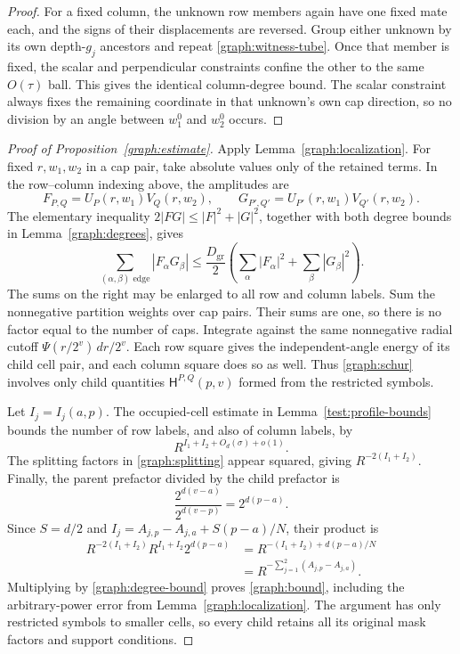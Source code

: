 \begin{proof}
For a fixed column, the unknown row members again have one fixed mate
each, and the signs of their displacements are reversed.  Group either
unknown by its own depth-$g_j$ ancestors and repeat
\eqref{graph:witness-tube}.  Once that member is fixed, the scalar and
perpendicular constraints confine the other to the same $O(\tau)$ ball.
This gives the identical column-degree bound.  The scalar constraint
always fixes the remaining coordinate in that unknown's own cap
direction, so no division by an angle between $w_1^0$ and $w_2^0$
occurs.
\end{proof}

\begin{proof}[Proof of Proposition~\ref{graph:estimate}]
Apply Lemma~\ref{graph:localization}.  For fixed $r,w_1,w_2$ in a cap
pair, take absolute values only of the retained terms.  In the
row--column indexing above, the amplitudes are
\[
 F_{P,Q}=U_P(r,w_1)V_Q(r,w_2),\qquad
 G_{P',Q'}=U_{P'}(r,w_1)V_{Q'}(r,w_2).
\]
The elementary inequality $2|FG|\le|F|^2+|G|^2$, together with both
degree bounds in Lemma~\ref{graph:degrees}, gives
\begin{equation}\label{graph:schur}
 \sum_{(\alpha,\beta)\text{ edge}}|F_\alpha G_\beta|
 \le\frac{D_{\mathrm{gr}}}{2}
       \left(\sum_\alpha|F_\alpha|^2+
             \sum_\beta|G_\beta|^2\right).
\end{equation}
The sums on the right may be enlarged to all row and column labels.
Sum the nonnegative partition weights over cap pairs.  Their sums
are one, so there is no factor equal to the number of caps.  Integrate
against the same nonnegative radial cutoff $\Psi(r/2^v)\,dr/2^v$.
Each row square gives the independent-angle energy of its child cell
pair, and each column square does so as well.  Thus
\eqref{graph:schur} involves only child quantities
$\mathsf H^{P,Q}(p,v)$ formed from the restricted symbols.

Let $I_j=I_j(a,p)$.  The occupied-cell estimate in
Lemma~\ref{test:profile-bounds} bounds the number of row labels, and
also of column labels, by
\[
 R^{I_1+I_2+O_d(\sigma)+o(1)}.
\]
The splitting factors in \eqref{graph:splitting} appear squared,
giving $R^{-2(I_1+I_2)}$.  Finally, the parent prefactor divided by
the child prefactor is
\[
 \frac{2^{d(v-a)}}{2^{d(v-p)}}=2^{d(p-a)}.
\]
Since $S=d/2$ and
$I_j=A_{j,p}-A_{j,a}+S(p-a)/N$, their product is
\begin{align*}
 R^{-2(I_1+I_2)}R^{I_1+I_2}2^{d(p-a)}
 &=R^{-(I_1+I_2)+d(p-a)/N}\\
 &=R^{-\sum_{j=1}^2(A_{j,p}-A_{j,a})}.
\end{align*}
Multiplying by \eqref{graph:degree-bound} proves
\eqref{graph:bound}, including the arbitrary-power error from
Lemma~\ref{graph:localization}.  The argument has only restricted
symbols to smaller cells, so every child retains all its original
mask factors and support conditions.
\end{proof}

